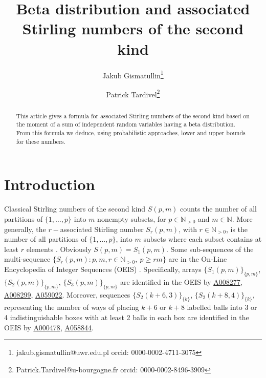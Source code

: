 \documentclass{article}
\theoremstyle{plain}
\newcommand{\N}{{\mathbb N}}
\begin{document}
\author[1]{Jakub Gismatullin\footnote{jakub.gismatullin@uwr.edu.pl \quad orcid: 0000-0002-4711-3075}}    
\author[1,2]{Patrick Tardivel\footnote{Patrick.Tardivel@u-bourgogne.fr \quad  orcid: 0000-0002-8496-3909}} 


\title{Beta distribution and associated Stirling numbers of the second kind}

\date{}

\maketitle


\begin{abstract}
This article gives a formula for associated Stirling numbers of the second kind  based on the moment of a sum of independent random variables having a beta distribution. From this formula we deduce, using probabilistic approaches, lower and upper bounds for these numbers.
\end{abstract}

\section{Introduction}
Classical Stirling numbers of the second kind $S(p,m)$ counts the number of all partitions of 
$\{1,\dots,p\}$ into $m$ nonempty subsets, for $p\in\N_{>0}$ and $ m\in\N$. More generally, the $r-$associated Stirling number $S_r(p, m)$, with $r\in \N_{>0}$, is the number of all partitions of 
$\{1,\dots,p\}$, into $m$ subsets where each subset contains at least $r$ elements \cite[p. 221]{comtet}. Obviously $S(p,m)=S_1(p,m)$.  Some sub-sequences of the multi-sequence $\{S_r(p,m):p,m,r\in\N_{>0},\ p\ge rm\}$ are in the On-Line Encyclopedia of Integer Sequences (OEIS) \cite{oeis}. Specifically, arrays  $\{S_1(p,m)\}_{\{p,m\}}$,   $\{S_2(p,m)\}_{\{p,m\}}$,
$\{S_3(p,m)\}_{\{p,m\}}$   are identified in the OEIS  by
\href{http://oeis.org/A008277}{A008277},  \href{http://oeis.org/A008299}{A008299},  \href{http://oeis.org/A059022}{A059022}. Moreover, sequences
$\{S_2(k + 6, 3)\}_{\{k\}}$, $\{S_2(k + 8, 4)\}_{\{k\}}$, representing the	number of ways of placing $k+6$ or $k+8$ labelled balls into 3 or 4 indistinguishable boxes with at least 2 balls in each box  are identified  in the OEIS  by
\href{http://oeis.org/A000478}{A000478}, \href{https://oeis.org/A058844}{A058844}.
\end{document}
